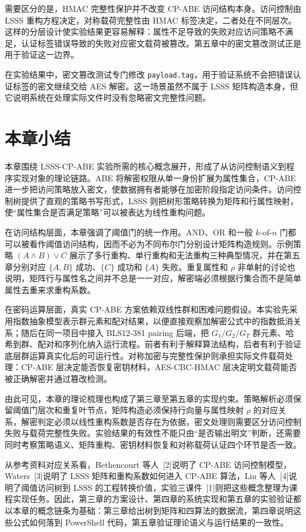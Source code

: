 需要区分的是，HMAC 完整性保护并不改变 CP-ABE 访问结构本身。访问控制由 LSSS 重构方程决定，对称载荷完整性由 HMAC 标签决定，二者处在不同层次。这样的分层设计使实验结果更容易解释：属性不足导致的失败对应访问策略不满足，认证标签错误导致的失败对应密文载荷被篡改。第五章中的密文篡改测试正是用于验证这一边界。

在实验结果中，密文篡改测试专门修改 \verb|payload.tag|，用于验证系统不会把错误认证标签的密文继续交给 AES 解密。这一场景虽然不属于 LSSS 矩阵构造本身，但它说明系统在处理实际文件时没有忽略密文完整性问题。

\section{本章小结}

本章围绕 LSSS-CP-ABE 实验所需的核心概念展开，形成了从访问控制语义到程序实现对象的理论链路。ABE 将解密权限从单一身份扩展为属性集合，CP-ABE 进一步把访问策略放入密文，使数据拥有者能够在加密阶段指定访问条件。访问控制树提供了直观的策略书写形式，LSSS 则把树形策略转换为矩阵和行属性映射，使“属性集合是否满足策略”可以被表达为线性重构问题。

在访问结构层面，本章强调了阈值门的统一作用。AND、OR 和一般 $k$-of-$n$ 门都可以被看作阈值访问结构，因而不必为不同布尔门分别设计矩阵构造规则。示例策略 $(A\wedge B)\vee C$ 展示了多行重构、单行重构和无法重构三种典型情况，并在第五章分别对应 $\{A,B\}$ 成功、$\{C\}$ 成功和 $\{A\}$ 失败。重复属性和 $\rho$ 非单射的讨论也说明，矩阵行与属性名之间并不总是一一对应，解密端必须根据行集合而不是简单属性去重来求重构系数。

在密码运算层面，真实 CP-ABE 方案依赖双线性群和困难问题假设。本实验先采用指数抽象模型表示群元素和配对结果，以便直接观察加解密公式中的指数抵消关系；随后在同一项目中接入 BLS12-381 pairing 后端，把 $G_1/G_2/G_T$ 群元素、哈希到群、配对和序列化纳入运行流程。前者有利于解释算法结构，后者有利于验证底层群运算真实化后的可运行性。对称加密与完整性保护则承担实际文件载荷处理：CP-ABE 层决定能否恢复密钥材料，AES-CBC-HMAC 层决定明文载荷能否被正确解密并通过篡改检测。

由此可见，本章的理论梳理也构成了第三章至第五章的实现约束。策略解析必须保留阈值门层次和重复叶节点，矩阵构造必须保持行向量与属性映射 $\rho$ 的对应关系，解密判定必须以线性重构系数是否存在为依据，密文处理则需要区分访问控制失败与载荷完整性失败。实验结果的有效性不能只由“是否输出明文”判断，还需要同时考察策略语义、矩阵重构、密钥材料恢复和对称载荷认证四个环节是否一致。

从参考资料对应关系看，Bethencourt 等人~[2]说明了 CP-ABE 访问控制模型，Waters~[3]说明了 LSSS 矩阵和重构系数如何进入 CP-ABE 算法，Liu 等人~[4]说明了阈值访问树到 LSSS 的工程转换价值，实验三课件~[1]则把这些概念整理为课程实现任务。因此，第三章的方案设计、第四章的系统实现和第五章的实验验证都以本章的概念链条为基础：第三章给出树到矩阵和四算法的数据流，第四章说明这些公式如何落到 PowerShell 代码，第五章验证理论语义与运行结果的一致性。

